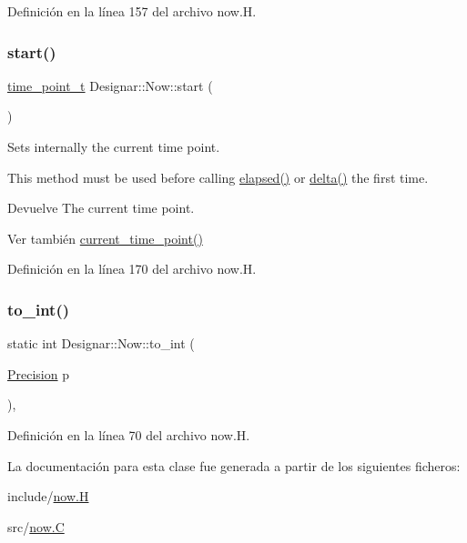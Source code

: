 Definición en la línea 157 del archivo now.\+H.

\mbox{\label{class_designar_1_1_now_a7ccb419799b46b7786b9ad0ac231de14}} 
\subsubsection{\texorpdfstring{start()}{start()}}
{\footnotesize\ttfamily \hyperlink{namespace_designar_a0edbd598eadb672df2c70e5af4dfccee}{time\+\_\+point\+\_\+t} Designar\+::\+Now\+::start (\begin{DoxyParamCaption}{ }\end{DoxyParamCaption})\hspace{0.3cm}{\ttfamily [inline]}}

Sets internally the current time point.

This method must be used before calling \hyperlink{class_designar_1_1_now_a3219d85172fc9628ef90f66c1d69a8e0}{elapsed()} or \hyperlink{class_designar_1_1_now_ae2a46a7ff8392fbadc9fb28ee17f7f5a}{delta()} the first time.

\begin{DoxyReturn}{Devuelve}
The current time point. 
\end{DoxyReturn}
\begin{DoxySeeAlso}{Ver también}
\hyperlink{class_designar_1_1_now_af862bb15a2202e02e31a1d11fac08dcf}{current\+\_\+time\+\_\+point()} 
\end{DoxySeeAlso}


Definición en la línea 170 del archivo now.\+H.

\mbox{\label{class_designar_1_1_now_a24c5b1e6f6d2e7d8030fd4b70a9a1b12}} 
\subsubsection{\texorpdfstring{to\+\_\+int()}{to\_int()}}
{\footnotesize\ttfamily static int Designar\+::\+Now\+::to\+\_\+int (\begin{DoxyParamCaption}\item[{\hyperlink{class_designar_1_1_now_a3c9f5e57907c88cbe63c70a64638c072}{Precision}}]{p }\end{DoxyParamCaption})\hspace{0.3cm}{\ttfamily [inline]}, {\ttfamily [static]}}



Definición en la línea 70 del archivo now.\+H.



La documentación para esta clase fue generada a partir de los siguientes ficheros\+:\begin{DoxyCompactItemize}
\item 
include/\hyperlink{now_8_h}{now.\+H}\item 
src/\hyperlink{now_8_c}{now.\+C}\end{DoxyCompactItemize}
